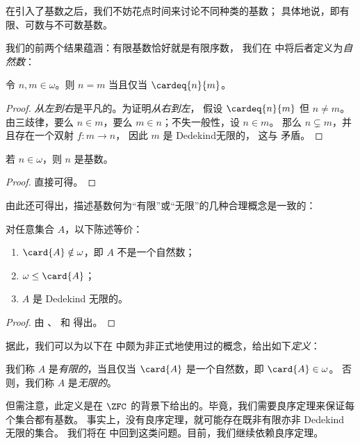 \documentclass[../../../include/open-logic-section]{subfiles}
\begin{document}

在引入了基数之后，我们不妨花点时间来讨论不同种类的基数；
具体地说，即有限、可数与不可数基数。

我们的前两个结果蕴涵：有限基数恰好就是有限序数，
我们在  中将后者定义为\emph{自然数}：

\begin{prop}
令 $n, m \in \omega$。则 $n = m$ 当且仅当 $\cardeq{n}{m}$。
\end{prop}

\begin{proof}
\emph{从左到右}是平凡的。为证明\emph{从右到左}，
假设 $\cardeq{n}{m}$ 但 $n \neq m$。
由三歧律，要么 $n \in m$，要么 $m \in n$；不失一般性，设 $n \in m$。
那么 $n \subsetneq m$，并且存在一个双射 $f \colon m \to n$，
因此 $m$ 是 Dedekind无限的，
这与  矛盾。
\end{proof}

\begin{cor}
若 $n \in \omega$，则 $n$ 是基数。
\end{cor}

\begin{proof}
直接可得。
\end{proof}
\noindent
由此还可得出，描述基数何为“有限”或“无限”的几种合理概念是一致的：
\begin{thm}对任意集合 $A$，以下陈述等价：
\begin{enumerate}
	\item{} $\card{A} \notin \omega$，即
	$A$ 不是一个自然数；
	\item{} $\omega \leq \card{A}$；
	\item{} $A$ 是 Dedekind 无限的。
\end{enumerate}
\end{thm}

\begin{proof}
由 、
 和
 得出。
\end{proof}

据此，我们可以为以下在  中颇为非正式地使用过的概念，给出如下\emph{定义}：

\begin{defn}
我们称 $A$ 是\emph{有限的}，当且仅当 $\card{A}$ 是一个自然数，即 $\card{A} \in \omega$。
否则，我们称 $A$ 是\emph{无限的}。
\end{defn}
\noindent
但需注意，此定义是在 $\ZFC$ 的背景下给出的。毕竟，我们需要良序定理来保证每个集合都有基数。
事实上，没有良序定理，就可能存在既非有限亦非 Dedekind 无限的集合。
我们将在  中回到这类问题。目前，我们继续依赖良序定理。
\end{document}
